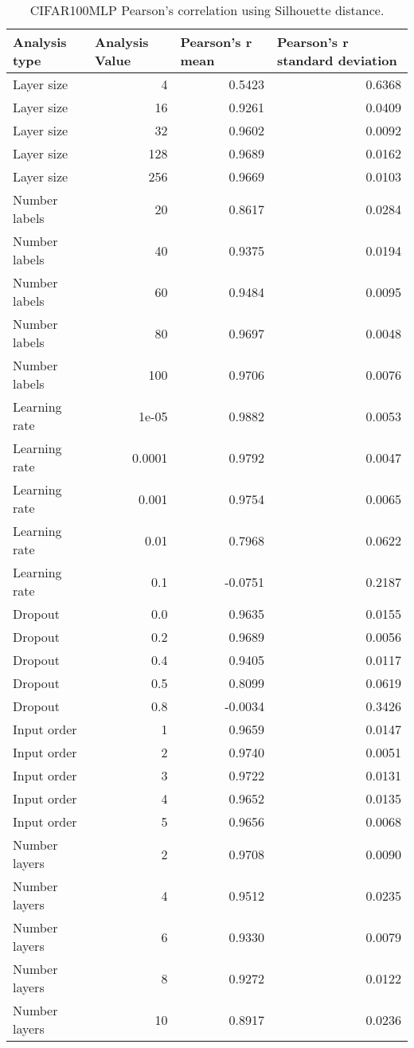 \documentclass{article}
\begin{document}
\begin{table}[H]
\centering
\begin{tabular}{@{}lrrr@{}}
\toprule
Analysis type & \multicolumn{1}{l}{Analysis Value} & \multicolumn{1}{l}{Pearson's r mean} & \multicolumn{1}{l}{Pearson's r standard deviation} \\ \midrule
Layer size & 4 & 0.5423 & 0.6368 \\ 
Layer size & 16 & 0.9261 & 0.0409 \\ 
Layer size & 32 & 0.9602 & 0.0092 \\ 
Layer size & 128 & 0.9689 & 0.0162 \\ 
Layer size & 256 & 0.9669 & 0.0103 \\ 
Number labels & 20 & 0.8617 & 0.0284 \\ 
Number labels & 40 & 0.9375 & 0.0194 \\ 
Number labels & 60 & 0.9484 & 0.0095 \\ 
Number labels & 80 & 0.9697 & 0.0048 \\ 
Number labels & 100 & 0.9706 & 0.0076 \\ 
Learning rate & 1e-05 & 0.9882 & 0.0053 \\ 
Learning rate & 0.0001 & 0.9792 & 0.0047 \\ 
Learning rate & 0.001 & 0.9754 & 0.0065 \\ 
Learning rate & 0.01 & 0.7968 & 0.0622 \\ 
Learning rate & 0.1 & -0.0751 & 0.2187 \\ 
Dropout & 0.0 & 0.9635 & 0.0155 \\ 
Dropout & 0.2 & 0.9689 & 0.0056 \\ 
Dropout & 0.4 & 0.9405 & 0.0117 \\ 
Dropout & 0.5 & 0.8099 & 0.0619 \\ 
Dropout & 0.8 & -0.0034 & 0.3426 \\ 
Input order & 1 & 0.9659 & 0.0147 \\ 
Input order & 2 & 0.9740 & 0.0051 \\ 
Input order & 3 & 0.9722 & 0.0131 \\ 
Input order & 4 & 0.9652 & 0.0135 \\ 
Input order & 5 & 0.9656 & 0.0068 \\ 
Number layers & 2 & 0.9708 & 0.0090 \\ 
Number layers & 4 & 0.9512 & 0.0235 \\ 
Number layers & 6 & 0.9330 & 0.0079 \\ 
Number layers & 8 & 0.9272 & 0.0122 \\ 
Number layers & 10 & 0.8917 & 0.0236 \\ 
\bottomrule
\end{tabular}
\caption{CIFAR100MLP Pearson's correlation using Silhouette distance.}
\end{table}
\end{document}
